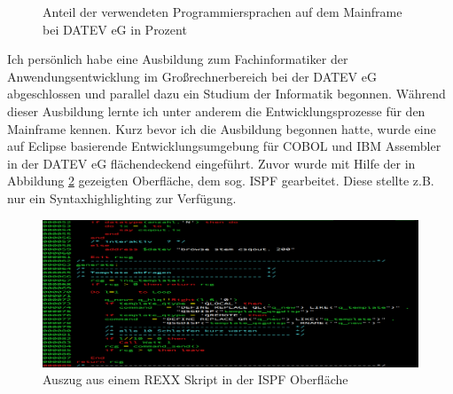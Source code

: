 \begin{figure}
\centering
\caption{Anteil der verwendeten Programmiersprachen auf dem Mainframe bei DATEV eG in Prozent}
\label{fig:Programmiersprachen}
\end{figure}

Ich persönlich habe eine Ausbildung zum Fachinformatiker der Anwendungsentwicklung im Großrechnerbereich bei der DATEV eG abgeschlossen und parallel dazu ein Studium der Informatik begonnen.
Während dieser Ausbildung lernte ich unter anderem die Entwicklungsprozesse für den Mainframe kennen.
Kurz bevor ich die Ausbildung begonnen hatte, wurde eine auf Eclipse basierende Entwicklungsumgebung für COBOL und IBM Assembler in der DATEV eG flächendeckend eingeführt.
Zuvor wurde mit Hilfe der in Abbildung \ref{fig:3270} gezeigten Oberfläche, dem sog. ISPF gearbeitet.
Diese stellte z.B. nur ein Syntaxhighlighting zur Verfügung.

\begin{figure}[h]
\centering
\includegraphics[width=\textwidth]{figures/rexxintso.png}
\caption{Auszug aus einem REXX Skript in der ISPF Oberfläche}
\label{fig:3270}
\end{figure}

